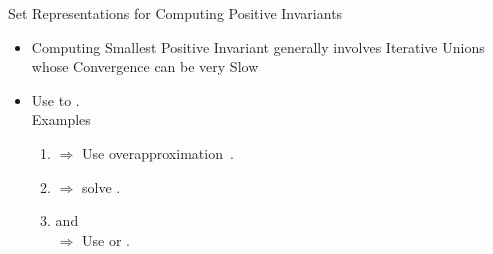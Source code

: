 \begin{frame}{Set Representations for Computing Positive Invariants}
\begin{itemize}
\item Computing Smallest {\color{red} Positive Invariant} generally involves { \color{red} Iterative Unions} whose {\color{red}Convergence can be very Slow}\pause
\item Use  to .\\
{\color{brown} Examples}
\begin{enumerate}
\item {} $\Rightarrow$ Use  overapproximation~\cite{todo}.
\item {} $\Rightarrow$ solve .
\item {} \cite{todo} and  \cite{todo} \\$\Rightarrow$ Use  or .
\end{enumerate}
\end{itemize}
\end{frame}

